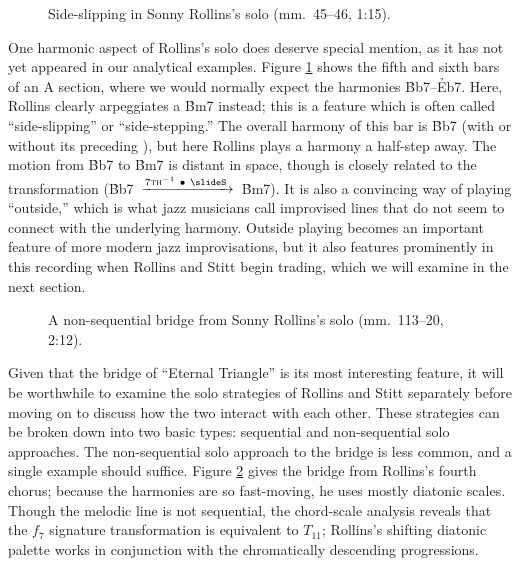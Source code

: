 \begin{figure}[tbp]
  \vspace{1em}
  \caption[Side-slipping in Sonny Rollins's solo.]{%
    Side-slipping in Sonny Rollins's solo (mm.~45--46, 1:15).}
  \label{et:sr-side-slipping}
\end{figure}

One harmonic aspect of Rollins's solo does deserve special mention, as it has
not yet appeared in our analytical examples. Figure \ref{et:sr-side-slipping}
shows the fifth and sixth bars of an A section, where we would normally expect
the harmonies \h{Bb7}--\h{Eb7}. Here, Rollins clearly arpeggiates a \h{Bm7}
instead; this is a feature which is often called ``side-slipping'' or
``side-stepping.'' The overall harmony of this bar is \h{Bb7} (with
or without its preceding \ii), but here Rollins plays a harmony a half-step
away. The motion from \h{Bb7} to \h{Bm7} is distant in \tf space, though is
closely related to the \slideS transformation \mbox{(\h{Bb7}
  $\xrightarrow{7\text{\textsc{th}}^{-1}\ \bullet\ \text{\slideS}\,}$
  \h{Bm7})}. It is also a convincing way of playing ``outside,''
which is what jazz musicians call improvised lines that do not seem to connect
with the underlying harmony. Outside playing becomes an important
feature of more modern jazz improvisations, but it also features prominently
in this recording when Rollins and Stitt begin trading, which we will examine
in the next section.

\begin{figure}[tbp]
  \caption[A non-sequential bridge from Sonny Rollins's solo.]{%
    A non-sequential bridge from Sonny Rollins's solo (mm.~113--20, 2:12).}
  \label{et:sr-non-seq}
\end{figure}

Given that the bridge of ``Eternal Triangle'' is its most interesting feature,
it will be worthwhile to examine the solo strategies of Rollins and Stitt
separately before moving on to discuss how the two interact with each other.
These strategies can be broken down into two basic types: sequential and
non-sequential solo approaches. The non-sequential solo approach to the bridge
is less common, and a single example should suffice. Figure
\ref{et:sr-non-seq} gives the bridge from Rollins's fourth chorus;
because the harmonies are so fast-moving, he uses mostly diatonic scales.
Though the melodic line is not sequential, the chord-scale analysis reveals
that the $f_7$ signature transformation is equivalent to $T_{11}$; Rollins's
shifting diatonic palette works in conjunction with the chromatically
descending \tf progressions.

